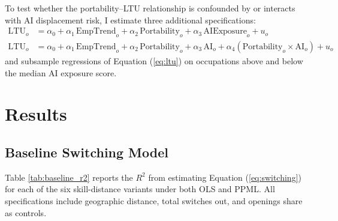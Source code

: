 \documentclass[12pt]{article}
\begin{document}
To test whether the portability--LTU relationship is confounded by or interacts with AI displacement risk, I estimate three additional specifications:
\begin{align}
\text{LTU}_o &= \alpha_0 + \alpha_1 \, \text{EmpTrend}_o + \alpha_2 \, \text{Portability}_o + \alpha_3 \, \text{AIExposure}_o + u_o \label{eq:ai_additive} \\
\text{LTU}_o &= \alpha_0 + \alpha_1 \, \text{EmpTrend}_o + \alpha_2 \, \text{Portability}_o + \alpha_3 \, \text{AI}_o + \alpha_4 (\text{Portability}_o \times \text{AI}_o) + u_o \label{eq:ai_interaction}
\end{align}
and subsample regressions of Equation (\ref{eq:ltu}) on occupations above and below the median AI exposure score.

\section{Results}
\label{sec:results}

\subsection{Baseline Switching Model}
\label{sec:results_baseline}

Table \ref{tab:baseline_r2} reports the $R^2$ from estimating Equation (\ref{eq:switching}) for each of the six skill-distance variants under both OLS and PPML. All specifications include geographic distance, total switches out, and openings share as controls.
\end{document}
